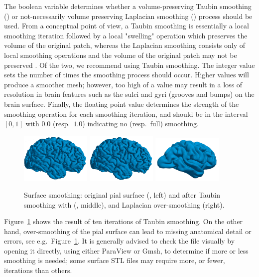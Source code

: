 The boolean variable  determines
whether a volume-preserving Taubin smoothing () or
not-necessarily volume preserving Laplacian smoothing
() process should be used.  From a conceptual
point of view, a Taubin smoothing is essentially a local smoothing
iteration followed by a local "swelling" operation which preserves the
volume of the original patch, whereas the Laplacian smoothing consists
only of local smoothing operations and the volume of the original
patch may not be preserved \cite{taubin1995curve}. Of the two, we
recommend using Taubin smoothing. The integer value 
sets the number of times the smoothing process should occur. Higher
values will produce a smoother mesh; however, too high of a value may
result in a loss of resolution in brain features such as the sulci and
gyri (grooves and bumps) on the brain surface. Finally, the floating
point value  determines the strength of the
smoothing operation for each smoothing iteration, and should be in the
interval $[0, 1]$ with $0.0$ (resp.~$1.0$) indicating no (resp.~full)
smoothing.
\begin{figure}
  \centering
  \includegraphics[width=0.30\textwidth]{./chapters/chp3/FIG/unsmoothed.png}
  \includegraphics[width=0.30\textwidth]{./chapters/chp3/FIG/taubin-smoothed-10.png}
  \includegraphics[width=0.30\textwidth]{./chapters/chp3/FIG/oversmoothing.png}
  \caption{Surface smoothing: original pial surface 
    (, left) and after Taubin smoothing with
    {\svmtk} (, middle), and Laplacian over-smoothing (right).}
  \label{fig:chp3:ernie-smoothing}
\end{figure}
Figure~\ref{fig:chp3:ernie-smoothing} shows the result of ten
iterations of Taubin smoothing. On the other hand, over-smoothing of
the pial surface can lead to missing anatomical detail or errors, see
e.g.~Figure~\ref{fig:chp3:ernie-smoothing}. It is generally advised to
check the file visually by opening it directly, using either ParaView
or Gmsh, to determine if more or less smoothing is needed; some
surface STL files may require more, or fewer, iterations than others.

